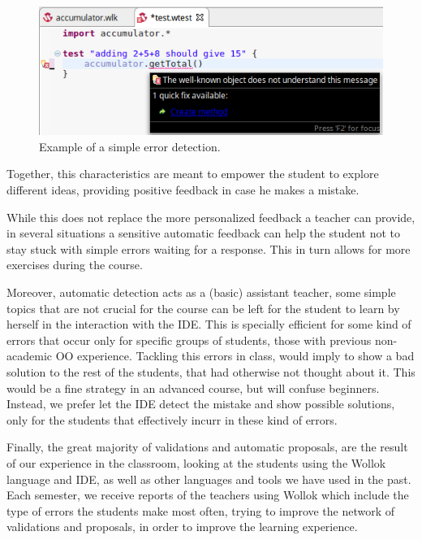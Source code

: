 \begin{figure}[ht]
 \centering
 \includegraphics[scale=0.5]{images/errorReporting.png}
 \caption{\small Example of a simple error detection.}
 \label{fig:errorReporting}
\end{figure}

\medskip
Together, this characteristics are meant to empower the student to explore different ideas, 
providing positive feedback in case he makes a mistake.

While this does not replace the more personalized feedback a teacher can provide, in several situations a sensitive automatic feedback can help the student not to stay stuck with simple errors waiting for a response.
This in turn allows for more exercises during the course.

Moreover, automatic detection acts as a (basic) assistant teacher, \ie some simple topics that are not crucial for the course can be left for the student to learn by herself in the interaction with the IDE.
This is specially efficient for some kind of errors that occur only for specific groups of students, \eg those with previous non-academic OO experience. 
Tackling this errors in class, would imply to show a bad solution to the rest of the students, that had otherwise not thought about it. This would be a fine strategy in an advanced course, but will confuse beginners.
Instead, we prefer let the IDE detect the mistake and show possible solutions, only for the students that effectively incurr in these kind of errors.

\medskip


Finally, the great majority of validations and automatic proposals, are the result of our experience in the classroom, looking at the students using the Wollok language and IDE, as well as other languages and tools we have used in the past.
Each semester, we receive reports of the teachers using Wollok which include the type of errors the students make most often, trying to improve the network of validations and proposals, in order to improve the learning experience.

